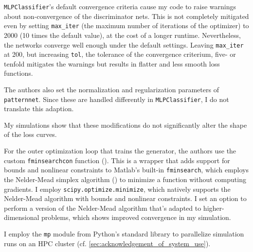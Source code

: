 \texttt{MLPClassifier}'s default convergence criteria cause my code to raise warnings about non-convergence of the discriminator nets.
This is not completely mitigated even by setting \texttt{max\_iter} (the maximum number of iterations of the optimizer) to 2000 (10 times the default value), at the cost of a longer runtime. %
Nevertheless, the networks converge well enough under the default settings. %
Leaving \texttt{max\_iter} at 200, but increasing \texttt{tol}, the tolerance of the convergence criterium, five- or tenfold mitigates the warnings but results in flatter and less smooth loss functions. %

The authors also set the normalization and regularization parameters of \texttt{patternnet}.
Since these are handled differently in \texttt{MLPClassifier}, I do not translate this adaption.

My simulations show that these modifications do not significantly alter the shape of the loss curves. %

For the outer optimization loop that trains the generator, the authors use the custom \texttt{fminsearchcon} function (\textcite{DErrico2024}).
This is a wrapper that adds support for bounds and nonlinear constraints to Matlab's built-in \texttt{fminsearch}, which employs the Nelder-Mead simplex algorithm (\textcite{lagarias1998convergence}) to minimize a function without computing gradients.
I employ \texttt{scipy.optimize.minimize}, which natively supports the Nelder-Mead algorithm with bounds and nonlinear constraints.
I set an option to perform a version of the Nelder-Mead algorithm that's adapted to higher-dimensional problems, which shows improved convergence in my simulation. %

I employ the \texttt{mp} module from Python's standard library to parallelize simulation runs on an HPC cluster (cf. \ref{sec:acknowledgement_of_system_use}).

